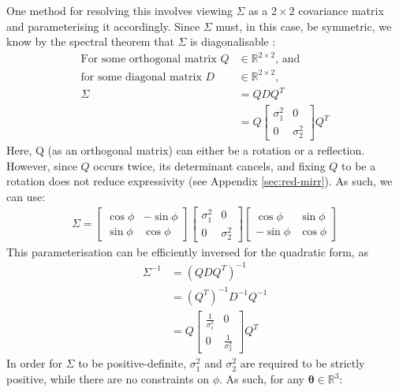 \documentclass[a4paper, 12pt]{report}
\begin{document}
One method for resolving this involves viewing $\Sigma$ as a $2\times2$ covariance matrix and parameterising it accordingly. Since $\Sigma$ must, in this case, be symmetric, we know by the spectral theorem that $\Sigma$ is diagonalisable \cite{poole2015linear}:
\begin{align}
\textrm{For some orthogonal matrix }Q &\in \mathbb{R}^{2\times 2} \textrm{, and} \nonumber \\
\textrm{for some diagonal matrix }D &\in \mathbb{R}^{2\times 2} \textrm{,}\nonumber \\
\Sigma &= QDQ^T\\
&= Q \begin{bmatrix}
	 \sigma_1^2 & 0\\ 0 &  \sigma_2^2
\end{bmatrix} Q^T
\end{align}
Here, Q (as an orthogonal matrix) can either be a rotation or a reflection. However, since $Q$ occurs twice, its determinant cancels, and fixing $Q$ to be a rotation does not reduce expressivity (see Appendix \ref{sec:red-mirr}). As such, we can use:
\begin{align}
\Sigma = \begin{bmatrix}
	\cos \phi & -\sin \phi \\ \sin\phi & \cos\phi
\end{bmatrix}\begin{bmatrix}
	 \sigma_1^2 & 0\\ 0 &  \sigma_2^2
\end{bmatrix} \begin{bmatrix}
	\cos \phi & \sin \phi \\ -\sin\phi & \cos\phi
\end{bmatrix}
\end{align}
This parameterisation can be efficiently inversed for the quadratic form, as \begin{align}
	\Sigma^{-1} &= (QDQ^T)^{-1}\\
	&= (Q^T)^{-1} D^{-1} Q^{-1}\\
	&= Q\begin{bmatrix}
	 \frac{1}{\sigma_1^2} & 0\\ 0 &  \frac{1}{\sigma_2^2}
\end{bmatrix}Q^T
\end{align}
In order for $\Sigma$ to be positive-definite, $\sigma_1^2$ and $\sigma_2^2$ are required to be strictly positive, while there are no constraints on $\phi$. As such, for any $\boldsymbol{\theta}\in\mathbb{R}^3$:
\end{document}
